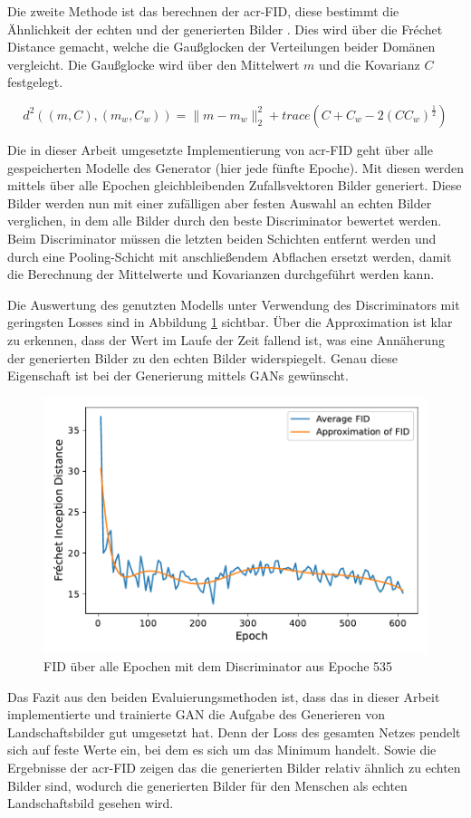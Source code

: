  Die zweite Methode ist das berechnen der \acrfull{acr-FID}, diese bestimmt die
 Ähnlichkeit der echten und der generierten Bilder \cite{heusel_gans_2017}. Dies
 wird über die Fr\'echet Distance gemacht, welche die Gaußglocken der
 Verteilungen beider Domänen vergleicht. Die Gaußglocke wird über den Mittelwert
 $m$ und die Kovarianz $C$ festgelegt. 
 
 \[d^2((m,C),(m_w,C_w)) =  \|m-m_w\|^2_2 + trace(C+ C_w - 2(CC_w)^{\frac{1}{2}})
 \]
 
 Die in dieser Arbeit umgesetzte Implementierung von \gls{acr-FID} geht über
 alle gespeicherten Modelle des Generator (hier jede fünfte Epoche). Mit diesen
 werden  
 mittels über alle Epochen gleichbleibenden Zufallsvektoren Bilder generiert.
 Diese Bilder werden nun mit einer zufälligen aber festen Auswahl an echten
 Bilder verglichen, in dem alle Bilder durch den beste Discriminator bewertet
 werden. Beim Discriminator müssen die letzten beiden Schichten entfernt werden
 und durch eine Pooling-Schicht mit anschließendem Abflachen ersetzt werden,
 damit die Berechnung der Mittelwerte und Kovarianzen durchgeführt werden kann. 
 
 Die Auswertung des genutzten Modells unter Verwendung des Discriminators mit
 geringsten Losses sind in Abbildung \ref{fig:plot_fids_gen} sichtbar. Über die
 Approximation ist klar zu erkennen, dass der Wert im Laufe der Zeit fallend
 ist, was eine Annäherung der generierten Bilder zu den echten Bilder
 widerspiegelt. Genau diese Eigenschaft ist bei der Generierung mittels GANs
 gewünscht.
 
 \begin{figure}
 	\centering
 	\includegraphics[width=0.7\linewidth]{images/plot_line_plot_fids_gen}
 	\caption[FID des generierdene GANs]{FID über alle Epochen mit dem Discriminator aus Epoche 535}
 	\label{fig:plot_fids_gen}
 \end{figure}
 
 Das Fazit aus den beiden Evaluierungsmethoden ist, dass das in dieser Arbeit
 implementierte und trainierte GAN die Aufgabe des Generieren von
 Landschaftsbilder gut umgesetzt hat. Denn der Loss des gesamten Netzes pendelt
 sich auf feste Werte ein, bei dem es sich um das Minimum handelt. Sowie die
 Ergebnisse der \gls{acr-FID} zeigen das die generierten Bilder relativ ähnlich
 zu echten Bilder sind, wodurch die generierten Bilder für den Menschen als
 echten Landschaftsbild gesehen wird.
 
 